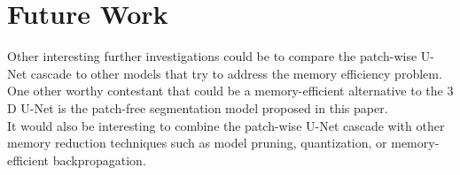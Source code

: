 \section{Future Work}
Other interesting further investigations could be to compare the patch-wise U-Net cascade to other models that try to address the memory efficiency problem.
One other worthy contestant that could be a memory-efficient alternative to the $3$D U-Net is the patch-free segmentation model proposed in this paper\cite{wang_super-resolution_2023}.\\[1ex]
It would also be interesting to combine the patch-wise U-Net cascade with other memory reduction techniques such as model pruning, quantization, or memory-efficient backpropagation.

